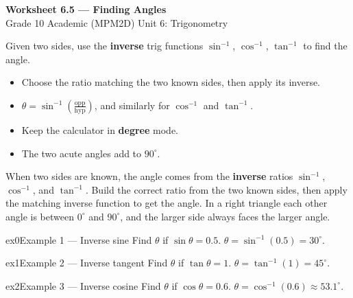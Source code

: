 \documentclass[11pt]{article}
\begin{document}
\begin{center}
{\LARGE\bfseries\color{titleblue}Worksheet 6.5 --- Finding Angles}\\[2pt]
{\small Grade 10 Academic (MPM2D) \textperiodcentered{} Unit 6: Trigonometry}
\end{center}

\begin{ideabox}
Given two sides, use the \textbf{inverse} trig functions $\sin^{-1}$, $\cos^{-1}$, $\tan^{-1}$ to find the angle.
\begin{itemize}[leftmargin=*,itemsep=2pt]
  \item Choose the ratio matching the two known sides, then apply its inverse.
  \item $\theta=\sin^{-1}\!\left(\tfrac{\text{opp}}{\text{hyp}}\right)$, and similarly for $\cos^{-1}$ and $\tan^{-1}$.
  \item Keep the calculator in \textbf{degree} mode.
  \item The two acute angles add to $90^\circ$.
\end{itemize}
\end{ideabox}

\begin{learnbox}
When two sides are known, the angle comes from the \textbf{inverse} ratios $\sin^{-1}$, $\cos^{-1}$, and $\tan^{-1}$.
Build the correct ratio from the two known sides, then apply the matching inverse function to get the angle.
In a right triangle each other angle is between $0^\circ$ and $90^\circ$, and the larger side always faces the larger angle.
\end{learnbox}


\begin{example}{ex0}{Example 1 --- Inverse sine}
Find $\theta$ if $\sin\theta=0.5$.
\soln $\theta=\sin^{-1}(0.5)=30^\circ.$
\end{example}

\begin{example}{ex1}{Example 2 --- Inverse tangent}
Find $\theta$ if $\tan\theta=1$.
\soln $\theta=\tan^{-1}(1)=45^\circ.$
\end{example}

\begin{example}{ex2}{Example 3 --- Inverse cosine}
Find $\theta$ if $\cos\theta=0.6$.
\soln $\theta=\cos^{-1}(0.6)\approx53.1^\circ.$
\end{example}
\end{document}
